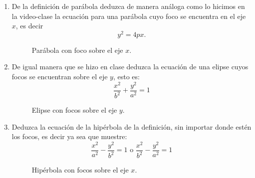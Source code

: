 \documentclass[letterpaper,11pt]{article}
\begin{document}
\begin{enumerate}


\item  De la definición de parábola deduzca de manera análoga como lo hicimos en la video-clase la ecuación para una parábola cuyo foco se encuentra en el eje $x$, es decir $$y^2 = 4px.$$ 

\begin{figure}[h!]
\centering
\caption{Parábola con foco sobre el eje $x$.}
\label{F1}
\end{figure}

\newpage
\item De igual manera que se hizo en clase deduzca la ecuación de una elipse cuyos focos se encuentran sobre el eje $y$, esto es: $$\dfrac{x^2}{b^2} + \dfrac{y^2}{a^2}=1$$

\begin{figure}[h!]
\centering
\caption{Elipse con focos sobre el eje $y$.}
\label{F1}
\end{figure}



\item Deduzca la ecuación de la hipérbola de la definición, sin importar donde estén los focos, es decir ya sea que muestre: $$\dfrac{x^2}{a^2} -  \dfrac{y^2}{b^2} = 1 \text{ o }  \dfrac{x^2}{b^2} - \dfrac{y^2}{a^2}=1$$

\begin{figure}[h!]
\centering
\caption{Hipérbola con focos sobre el eje $x$.}
\label{F1}
\end{figure}




\end{enumerate}
\end{document}
